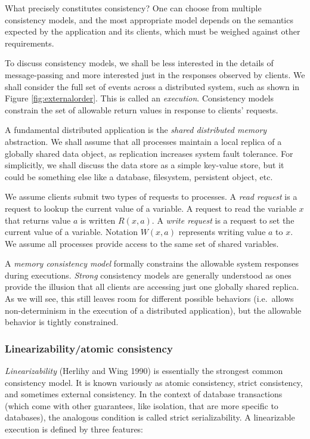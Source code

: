 \documentclass[]             %
{NASA}                       %
\theoremstyle{definition}
\begin{document}
\label{sec:atomic}

What precisely constitutes consistency? One can choose from multiple
consistency models, and the most appropriate model depends on the
semantics expected by the application and its clients, which must be
weighed against other requirements.

To discuss consistency models, we shall be less interested in the
details of message-passing and more interested just in the responses
observed by clients. We shall consider the full set of events across a
distributed system, such as shown in Figure \ref{fig:externalorder}.
This is called an \emph{execution}. Consistency models constrain the set
of allowable return values in response to clients' requests.

A fundamental distributed application is the \emph{shared distributed
memory} abstraction. We shall assume that all processes maintain a local
replica of a globally shared data object, as replication increases
system fault tolerance. For simplicitly, we shall discuss the data store
as a simple key-value store, but it could be something else like a
database, filesystem, persistent object, etc.

We assume clients submit two types of requests to processes. A
\emph{read request} is a request to lookup the current value of a
variable. A request to read the variable \(x\) that returns value \(a\)
is written \(R(x,a)\). A \emph{write request} is a request to set the
current value of a variable. Notation \(W(x,a)\) represents writing
value \(a\) to \(x\). We assume all processes provide access to the same
set of shared variables.

A \emph{memory consistency model} formally constrains the allowable
system responses during executions. \emph{Strong} consistency models are
generally understood as ones provide the illusion that all clients are
accessing just one globally shared replica. As we will see, this still
leaves room for different possible behaviors (i.e.~allows
non-determinism in the execution of a distributed application), but the
allowable behavior is tightly constrained.

\hypertarget{linearizabilityatomic-consistency}{%
\subsubsection{Linearizability/atomic
consistency}\label{linearizabilityatomic-consistency}}

\emph{Linearizability} (Herlihy and Wing 1990) is essentially the
strongest common consistency model. It is known variously as atomic
consistency, strict consistency, and sometimes external consistency. In
the context of database transactions (which come with other guarantees,
like isolation, that are more specific to databases), the analogous
condition is called strict serializability. A linearizable execution is
defined by three features:
\end{document}
